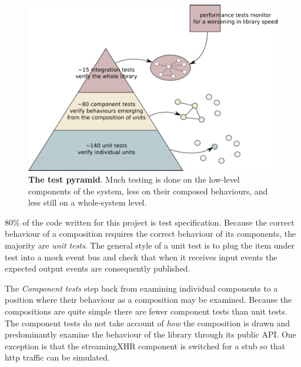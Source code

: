 \documentclass[]{article}
\makeatletter
\def\maxwidth{\ifdim\Gin@nat@width>\linewidth\linewidth
\else\Gin@nat@width\fi}
\let\Oldincludegraphics\includegraphics
\renewcommand{\includegraphics}[1]{\Oldincludegraphics[width=\maxwidth]{#1}}
\makeatother
\begin{document}
\begin{figure}[htbp]
\centering
\includegraphics{images/testPyramid.png}
\caption{\textbf{The test pyramid}. Much testing is done on the
low-level components of the system, less on their composed behaviours,
and less still on a whole-system level. \label{testpyramid}}
\end{figure}

80\% of the code written for this project is test specification. Because
the correct behaviour of a composition requires the correct behaviour of
its components, the majority are \emph{unit tests}. The general style of
a unit test is to plug the item under test into a mock event bus and
check that when it receives input events the expected output events are
consequently published.

The \emph{Component tests} step back from examining individual
components to a position where their behaviour as a composition may be
examined. Because the compositions are quite simple there are fewer
component tests than unit tests. The component tests do not take account
of \emph{how} the composition is drawn and predominantly examine the
behaviour of the library through its public API. One exception is that
the streamingXHR component is switched for a stub so that http traffic
can be simulated.
\end{document}
